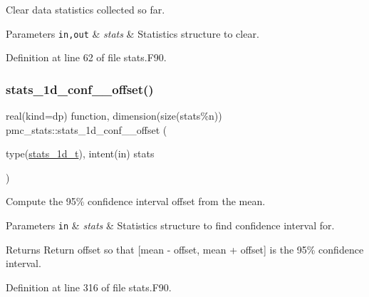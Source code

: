 Clear data statistics collected so far. 


\begin{DoxyParams}[1]{Parameters}
\mbox{\tt in,out}  & {\em stats} & Statistics structure to clear. \\
\hline
\end{DoxyParams}


Definition at line 62 of file stats.\+F90.

\mbox{\label{namespacepmc__stats_abb0f22506fbe1564d5dfe9b348967e3f}} 
\subsubsection{\texorpdfstring{stats\+\_\+1d\+\_\+conf\+\_\+\_\+offset()}{stats\_1d\_conf\_95\_offset()}}
{\footnotesize\ttfamily real(kind=dp) function, dimension(size(stats\%n)) pmc\+\_\+stats\+::stats\+\_\+1d\+\_\+conf\+\_\+\_\+offset (\begin{DoxyParamCaption}\item[{type(\mbox{\hyperlink{structpmc__stats_1_1stats__1d__t}{stats\+\_\+1d\+\_\+t}}), intent(in)}]{stats }\end{DoxyParamCaption})}



Compute the 95\% confidence interval offset from the mean. 


\begin{DoxyParams}[1]{Parameters}
\mbox{\tt in}  & {\em stats} & Statistics structure to find confidence interval for.\\
\hline
\end{DoxyParams}
\begin{DoxyReturn}{Returns}
Return offset so that \mbox{[}mean -\/ offset, mean + offset\mbox{]} is the 95\% confidence interval. 
\end{DoxyReturn}


Definition at line 316 of file stats.\+F90.

\mbox{\label{namespacepmc__stats_a644ef48950c748f3ab3a3d9276186c21}} 
